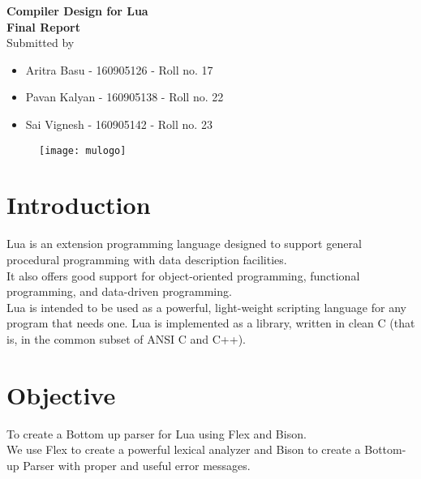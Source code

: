\documentclass[12pt]{article}
\renewcommand{\maketitle}{
    \begin{center}
        {\Huge\bfseries Compiler Design for Lua\\[1em] Final Report}\\[12em]
    {\LARGE Submitted by}\\[5em]
    \begin{itemize}
        \setlength{\itemsep}{1.2\baselineskip}
        \raggedright
        \item{\Large Aritra Basu - 160905126 - Roll no. 17}\\
        \item{\Large Pavan Kalyan - 160905138 - Roll no. 22}\\
        \item{\Large Sai Vignesh - 160905142 - Roll no. 23}\\
    \end{itemize}
    \end{center}
}
\begin{document}
\maketitle
\begin{figure}[b]
    \centering
\texttt{[image: mulogo]}
\end{figure}
\newpage
\section{Introduction}
Lua is an extension programming language designed to support general procedural programming with data description facilities.\\ It also offers good support for object-oriented programming, functional programming, and data-driven programming.\\ Lua is intended to be used as a powerful, light-weight scripting language for any program that needs one. Lua is implemented as a library, written in clean C (that is, in the common subset of ANSI C and C++).
\section{Objective}
To create a Bottom up parser for Lua using Flex and Bison.\\
We use Flex to create a powerful lexical analyzer and Bison to create a Bottom-up Parser with proper and useful error messages. 
\end{document}
